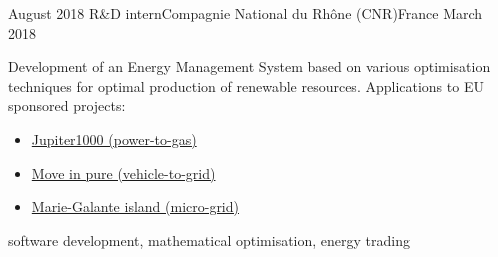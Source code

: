 %
%
%
\begin{experiences}
  \experience
    {August 2018}   {R\&D intern}{Compagnie National du Rh\^one (CNR)}{France}
    {March 2018} {Development of an Energy Management System based on various optimisation techniques for optimal production of renewable resources. Applications to EU sponsored projects:
    \begin{itemize}
        \item \hyperlink{https://www.jupiter1000.eu/english}{Jupiter1000 (power-to-gas)}
        \item \hyperlink{https://www.cnr.tm.fr/en/innovation/close-to-the-pulse-of-the-territories/}{Move in pure (vehicle-to-grid)}
        \item \hyperlink{https://www.youtube.com/watch?v=962bBweyx1s}{Marie-Galante island (micro-grid)}
    \end{itemize}}
                    {software development, mathematical optimisation, energy trading}
\end{experiences}
